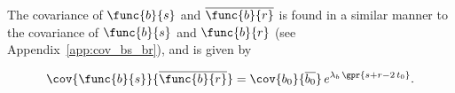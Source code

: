 The covariance of $\func{b}{s}$ and $\overline{\func{b}{r}}$ is found in a similar manner to the covariance of $\func{b}{s}$ and $\func{b}{r}$ (see Appendix~\ref{app:cov_bs_br}), and is given by

\begin{equation}
    \cov{\func{b}{s}}{\overline{\func{b}{r}}} = \cov{b_0}{\overline{b_0}}\,e^{\lambda_{b}\,\gpr{s + r - 2\,t_0}}. \label{eqn:cov_bs_conjgbr}
\end{equation}